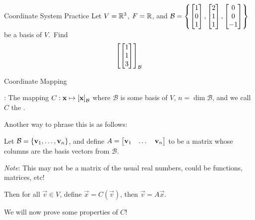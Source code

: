 \documentclass[xcoler=dvipsnames, aspectratio=169]{beamer}
\newcommand{\B}{\mathcal{B}}
\begin{document}
    \begin{frame}{Coordinate System Practice}
        Let $V=\mathbb{R}^3$, $F=\mathbb{R}$, and $\B=\setBasic{\bMat{1\\0\\1}, \bMat{2\\1\\1}, \bMat{0\\0\\-1}}$
        be a basis of $V$.\pause\ 
        Find 
        \[
            \bCoord{\bMat{1\\1\\3}}{\B}
        \]
        \iftoggle{showSolutions}{
            \pause
        \[
            \bCoord{\bMat{1\\1\\3}}{\B} = \bMat{-1\\1\\-3}
        \]
        }{
            \vspace{100pt}
        }
    \end{frame}
    \begin{frame}{Coordinate Mapping}
        \begin{defn}
            : The mapping $C: \vec{x}\mapsto\bCoord{\vec{x}}{\B}$
            where $\B$ is some basis of $V$, $n=\dim{\B}$, and we call $C$ the .
        \end{defn}
        \pause
        Another way to phrase this is as follows:\pause

        \vspace{10pt}
        Let $\B=\setBasic{\vec{v}_1,\dots,\vec{v}_n}$, and define $A=\begin{bmatrix}\mathbf{v}_1 & \dots & \mathbf{v}_n\end{bmatrix}$
        to be a matrix whose columns are the basis vectors from $\B$.\pause

        \vspace{10pt}
        \emph{Note}: This may not be a matrix of the usual real numbers, could be functions, matrices, etc!\pause

        Then for all $\vec{v}\in V$, define $\vec{x} = C(\vec{v})$, then $\vec{v} = A\vec{x}$.\pause
        \vspace{10pt}

        We will now prove some properties of $C$!
    \end{frame}
\end{document}
